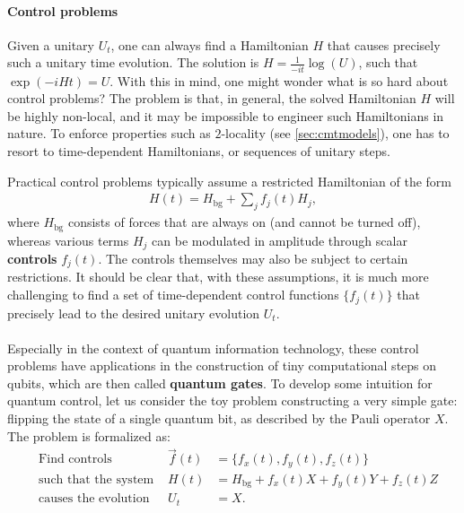 \paragraph{Control problems} Given a unitary $U_t$, one can always find a Hamiltonian $H$ that causes precisely such a unitary time evolution. The solution is $H = \frac{1}{-it} \log( U )$, such that $\exp(-i H t) = U$. 
With this in mind, one might wonder what is so hard about control problems? The problem is that, in general, the solved Hamiltonian $H$ will be highly non-local, and it may be impossible to engineer such Hamiltonians in nature. To enforce properties such as $2$-locality (see \cref{sec:cmtmodels}), one has to resort to time-dependent Hamiltonians, or sequences of unitary steps. 

Practical control problems typically assume a restricted Hamiltonian of the form \cite{Dong2010}
\begin{align}
H(t) = H_\text{bg} + \sum_j f_j(t) H_j,
\end{align}
where $H_\text{bg}$ consists of forces that are always on (and cannot be turned off), whereas various terms $H_j$ can be modulated in amplitude through scalar \textbf{controls} $f_j(t)$. The controls themselves may also be subject to certain restrictions. It should be clear that, with these assumptions, it is much more challenging to find a set of time-dependent control functions $\{ f_j(t) \}$ that precisely lead to the desired unitary evolution $U_t$.


\paragraph{}
Especially in the context of quantum information technology, these control problems have applications in the construction of tiny computational steps on qubits, which are then called \textbf{quantum gates}. To develop some intuition for quantum control, let us consider the toy problem constructing a very simple gate: flipping the state of a single quantum bit, as described by the Pauli operator $X$. The problem is formalized as:
\begin{align}
& \text{Find controls }& \vec{f}(t) &= \{ f_x(t), f_y(t), f_z(t) \} \nonumber \\
& \text{such that the system } &  H(t) &= H_\text{bg} + f_x(t) X + f_y(t) Y + f_z(t) Z    \label{eq:controlproblem} \\
& \text{causes the evolution } & U_{t} &= X. \nonumber
\end{align}


